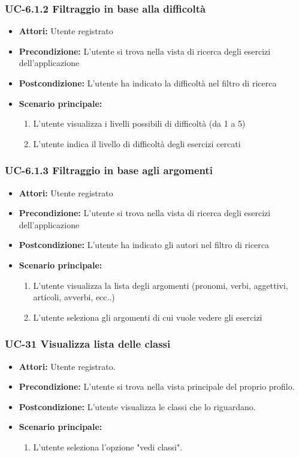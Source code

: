 \subsubsection{UC-6.1.2 Filtraggio in base alla difficoltà}
	\begin{itemize}
		\item \textbf{Attori:} Utente registrato
		\item \textbf{Precondizione: } L'utente si trova nella vista di ricerca degli esercizi dell'applicazione
		\item \textbf{Postcondizione: } L'utente ha indicato la difficoltà nel filtro di ricerca 
		\item \textbf{Scenario principale:}
		\begin{enumerate}
			\item L'utente visualizza i livelli possibili di difficoltà (da 1 a 5)
			\item L'utente indica il livello di difficoltà degli esercizi cercati
		\end{enumerate}
	\end{itemize}

\subsubsection{UC-6.1.3 Filtraggio in base agli argomenti}
	\begin{itemize}
		\item \textbf{Attori:} Utente registrato
		\item \textbf{Precondizione: } L'utente si trova nella vista di ricerca degli esercizi dell'applicazione
		\item \textbf{Postcondizione: } L'utente ha indicato gli autori nel filtro di ricerca 
		\item \textbf{Scenario principale:}
		\begin{enumerate}
			\item L'utente visualizza la lista degli argomenti (pronomi, verbi, aggettivi, articoli, avverbi, ecc..)
			\item L'utente seleziona gli argomenti di cui vuole vedere gli esercizi
		\end{enumerate}
	\end{itemize}

\subsubsection{UC-31 Visualizza lista delle classi}		
\begin{itemize}
	\item \textbf{Attori:} Utente registrato.
	\item \textbf{Precondizione:} L'utente si trova nella vista principale del proprio profilo.
	\item \textbf{Postcondizione:} L'utente visualizza le classi che lo riguardano.
	\item \textbf{Scenario principale:}
	\begin{enumerate}
		\item L'utente seleziona l'opzione "vedi classi".
	\end{enumerate}		
\end{itemize}

